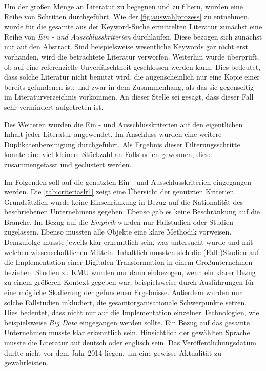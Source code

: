 Um der großen Menge an Literatur zu begegnen und zu filtern, wurden eine Reihe von Schritten durchgeführt. Wie der \ref{fig:auswahlprozess} zu entnehmen, wurde für die gesamte aus der Keyword-Suche ermittelten Literatur zunächst eine Reihe von \textit{Ein - und Ausschlusskriterien} durchlaufen. Diese bezogen sich zunächst nur auf den Abstract. Sind beispielsweise wesentliche Keywords gar nicht erst vorhanden, wird die betrachtete Literatur verworfen. Weiterhin wurde überprüft, ob auf eine referenzielle Unverfälschtheit geschlossen werden kann. Dies bedeutet, dass solche Literatur nicht benutzt wird, die augenscheinlich nur eine Kopie einer bereits gefundenen ist; und zwar in dem Zusammenhang, als das sie gegenseitig im Literaturverzeichnis vorkommen. An dieser Stelle sei gesagt, dass dieser Fall sehr vermindert aufgetreten ist. 

Des Weiteren wurden die Ein - und Ausschlusskriterien auf den eigentlichen Inhalt jeder Literatur angewendet. Im Anschluss wurden eine weitere Duplikatenbereinigung durchgeführt. Als Ergebnis dieser Filterungsschritte konnte eine viel kleinere Stückzahl an Fallstudien gewonnen, diese zusammengefasst und geclustert werden.

Im Folgenden soll auf die genutzten Ein - und Ausschlusskriterien eingegangen werden. Die \ref{tab:criteriaslr1} zeigt eine Übersicht der genutzten Kriterien. Grundsätzlich wurde keine Einschränkung in Bezug auf die Nationalität des beschriebenen Unternehmens gegeben. Ebenso gab es keine Beschränkung auf die Branche. Im Bezug auf die \textit{Empirik} wurden nur Fallstudien oder Studien zugelassen. Ebenso mussten alle Objekte eine klare Methodik vorweisen. Demzufolge musste jeweils klar erkenntlich sein, was untersucht wurde und mit welchen wissenschaftlichen Mitteln. Inhaltlich mussten sich die (Fall-)Studien auf die  Implementation einer Digitalen Transformation in einem Großunternehmen beziehen. Studien zu KMU wurden  nur dann einbezogen, wenn ein klarer Bezug zu einem größeren Kontext gegeben war, beispielsweise durch Ausführungen für eine mögliche Skalierung der gefundenen Ergebnisse. Außerdem wurden nur solche Fallstudien inkludiert, die gesamtorganisationale Schwerpunkte setzen. Dies bedeutet, dass nicht nur auf die Implementation einzelner Technologien, wie beispielsweise \textit{Big Data} eingegangen werden sollte. Ein Bezug auf  das gesamte Unternehmen musste klar erkenntlich sein. Hinsichtlich der gewählten Sprache musste die Literatur auf deutsch oder englisch sein. Das Veröffentlichungsdatum durfte nicht vor dem Jahr 2014 liegen, um eine gewisse Aktualität zu gewährleisten.

